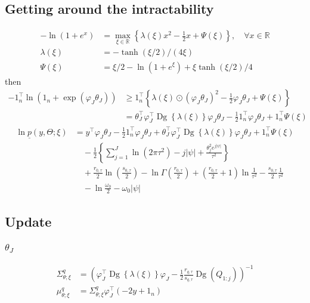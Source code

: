 \documentclass[11pt]{article}
\newcommand{\opn}{\operatorname}
\begin{document}
\subsection{Getting around the intractability}
\begin{align*}
  -\ln\left(1+e^{x}\right) &= \max_{\xi \in \mathbb{R}}\left\{\lambda\left(\xi\right)x^{2} - \frac{1}{2}x+\Psi\left(\xi\right) \right\}, \quad \forall x \in \mathbb{R}\\
  \lambda\left(\xi\right) &= -\tanh\left(\xi/2\right)/\left(4\xi\right)\\
  \Psi\left(\xi\right) &= \xi/2 - \ln\left(1+e^{\xi}\right) + \xi\tanh\left(\xi/2\right)/4
\end{align*}
then
\begin{align*}
  -1_{n}^{\top}\ln\left(1_{n}+\exp\left(\varphi_{J}\theta_{J}\right)\right) &\geq 1_{n}^{\top}\left\{\lambda\left(\xi\right) \odot \left(\varphi_{J}\theta_{J}\right)^{2} -\frac{1}{2}\varphi_{J}\theta_{J} + \Psi\left(\xi\right) \right\}\\
  &= \theta_{J}^{\top}\varphi_{J}^{\top}\opn{Dg}\left\{\lambda\left(\xi\right) \right\}\varphi_{J}\theta_{J} -\frac{1}{2}1_{n}^{\top}\varphi_{J}\theta_{J} + 1_{n}^{\top}\Psi\left(\xi\right)
\end{align*}
\begin{align*}
  \ln \underline{p}\left(y,\Theta;\xi\right) &= y^{\top}\varphi_{J}\theta_{J} -\frac{1}{2}1_{n}^{\top}\varphi_{J}\theta_{J} +\theta_{J}^{\top}\varphi_{J}^{\top}\opn{Dg}\left\{\lambda\left(\xi\right) \right\}\varphi_{J}\theta_{J} +1_{n}^{\top}\Psi\left(\xi\right) \\
    &\quad -\frac{1}{2}\left\{\sum_{j=1}^{J}\ln\left(2\pi\tau^{2}\right) - j\left|\psi\right| + \frac{\theta_{j}^{2}e^{j\left|\psi\right|}}{\tau^{2}}\right\}\\
    &\quad +\frac{r_{0,\tau}}{2}\ln\left(\frac{s_{0,\tau}}{2}\right) - \ln\Gamma\left(\frac{r_{0,\tau}}{2}\right) + \left(\frac{r_{0,\tau}}{2}+1\right)\ln\frac{1}{\tau^{2}} -\frac{s_{0,\tau}}{2}\frac{1}{\tau^{2}}\\
    &\quad -\ln\frac{\omega_{0}}{2} -\omega_{0}\left|\psi\right|
\end{align*}
\subsection{Update}
\subsubsection{$\theta_{J}$}
\begin{align*}
  \Sigma_{\theta;\xi}^{q} &= \left(\varphi_{J}^{\top}\opn{Dg}\left\{\lambda\left(\xi\right) \right\}\varphi_{J}-\frac{1}{2}\frac{r_{q,\tau}}{s_{q,\tau}}\opn{Dg}\left(Q_{1:j}\right)\right)^{-1}\\
  \mu_{\theta;\xi}^{q} &= \Sigma_{\theta;\xi}^{q}\varphi_{J}^{\top}\left(-2y +1_{n}\right)
\end{align*}
\end{document}
